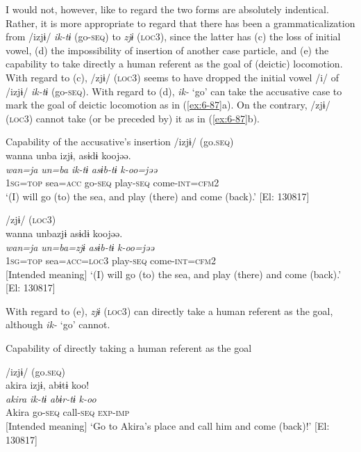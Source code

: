   I would not, however, like to regard the two forms are absolutely indentical. Rather, it is more appropriate to regard that there has been a grammaticalization from /izjɨ/ \textit{ik-tɨ} (go-\textsc{seq}) to \textit{zjɨ} (\textsc{loc3}), since the latter has (c) the loss of initial vowel, (d) the impossibility of insertion of another case particle, and (e) the capability to take directly a human referent as the goal of (deictic) locomotion. With regard to (c), /zjɨ/ (\textsc{loc3}) seems to have dropped the initial vowel /i/ of /izjɨ/ \textit{ik-tɨ} (go-\textsc{seq}). With regard to (d), \textit{ik-} ‘go’ can take the accusative case to mark the goal of deictic locomotion as in (\ref{ex:6-87}a). On the contrary, /zjɨ/ (\textsc{loc3}) cannot take (or be preceded by) it as in (\ref{ex:6-87}b).

\ea\label{ex:6-87}
  Capability of the accusative’s insertion
 \ea /izjɨ/ (go.\textsc{seq})\\
{\TM}
\glll  wanna  unba  izjɨ,  asɨdɨ  koojəə.\\
\textit{wan=ja}  \textit{un=ba}  \textit{ik-tɨ}  \textit{asɨb-tɨ}  \textit{k-oo=jəə}\\
1\textsc{sg}=\textsc{top}  sea=\textsc{acc}  go-\textsc{seq}  play-\textsc{seq}  come-\textsc{int}=\textsc{cfm}2\\
\glt ‘(I) will go (to) the sea, and play (there) and come (back).’ [El: 130817]

\ex /zjɨ/ (\textsc{loc3})\\
{\TM}
\glll  *wanna  unbazjɨ  asɨdɨ  koojəə.\\
\textit{wan=ja}  \textit{un=ba=zjɨ}  \textit{asɨb-tɨ}  \textit{k-oo=jəə}\\
1\textsc{sg}=\textsc{top}  sea=\textsc{acc}=\textsc{loc3}  play-\textsc{seq}  come-\textsc{int}=\textsc{cfm}2\\
{}      [Intended meaning] ‘(I) will go (to) the sea, and play (there) and come (back).’ [El: 130817]
\z
\z

With regard to (e), \textit{zjɨ} (\textsc{loc3}) can directly take a human referent as the goal, although \textit{ik-} ‘go’ cannot.

\ea\label{ex:6-88}
  Capability of directly taking a human referent as the goal

 \ea /izjɨ/ (go.\textsc{seq})\\
{\TM}
\glll  *akira  izjɨ,  abɨtɨ  koo!\\
\textit{akira}  \textit{ik-tɨ}  \textit{abɨr-tɨ}  \textit{k-oo}\\
Akira  go-\textsc{seq}  call-\textsc{seq}  \textsc{exp}-\textsc{imp}\\
{}       [Intended meaning] ‘Go to Akira’s place and call him and come (back)!’ [El: 130817]

